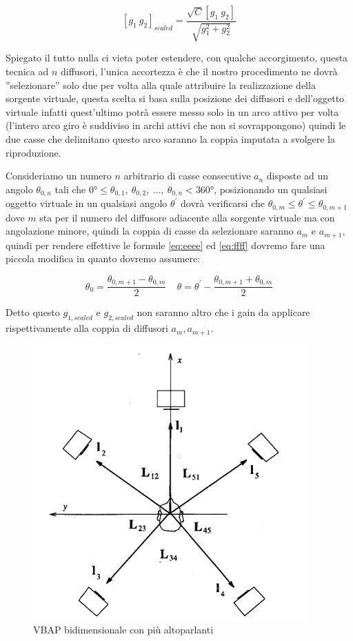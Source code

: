 \documentclass[12pt,a4paper]{report}
\begin{document}
\begin{equation}
\left[g_1 \ g_2\right]_{scaled} = \dfrac{\sqrt{C} \left[ g_1 \ g_2 \right]}{\sqrt{g_1^2 + g_2^2}}
\label{eq:ffff}
\end{equation}

Spiegato il tutto nulla ci vieta poter estendere, con qualche accorgimento, questa tecnica ad $n$ diffusori, l'unica accortezza è che il nostro procedimento ne dovrà ''selezionare'' solo due per volta alla quale attribuire la realizzazione della sorgente virtuale, questa scelta si basa sulla posizione dei diffusori e dell'oggetto virtuale infatti quest'ultimo potrà essere messo solo in un arco attivo per volta (l'intero arco giro è suddiviso in archi attivi che non si sovrappongono) quindi le due casse che delimitano questo arco saranno la coppia imputata a svolgere la riproduzione.

Consideriamo un numero $n$ arbitrario di casse consecutive $a_n$ disposte ad un angolo $\theta_{0,n}$ tali che $0°\leq \theta_{0,1},\ \theta_{0,2},\ \ldots,\ \theta_{0,n} <360°$, posizionando un qualsiasi oggetto virtuale in un qualsiasi angolo $\theta^{\prime}$ dovrà verificarsi che $\theta_{0,m}\leq \theta^{\prime} \leq \theta_{0,m+1}$ dove $m$ sta per il numero del diffusore adiacente alla sorgente virtuale ma con angolazione minore, quindi la coppia di casse da selezionare saranno $a_m$ e $a_{m+1}$, quindi per rendere effettive le formule \ref{eq:eeee} ed \ref{eq:ffff} dovremo fare una piccola modifica in quanto dovremo assumere:

\begin{equation}
\theta_0 = \dfrac{\theta_{0,m+1}-\theta_{0,m}}{2} \ \ \ \ \ \theta=\theta^{\prime}-\dfrac{\theta_{0,m+1}+\theta_{0,m}}{2}
\label{phidiverso}
\end{equation}

Detto questo $g_{1,scaled}$ e $g_{2,scaled}$ non saranno altro che i gain da applicare rispettivamente alla coppia di diffusori $a_{m} , a_{m+1}$.
 \begin{figure}[htbp]
	\centering
	\includegraphics[scale=0.55]{figures/matrix5-1.png}
	\caption {VBAP bidimensionale con più altoparlanti}
	\label{fig:angoli5}
	\end{figure}
\end{document}
